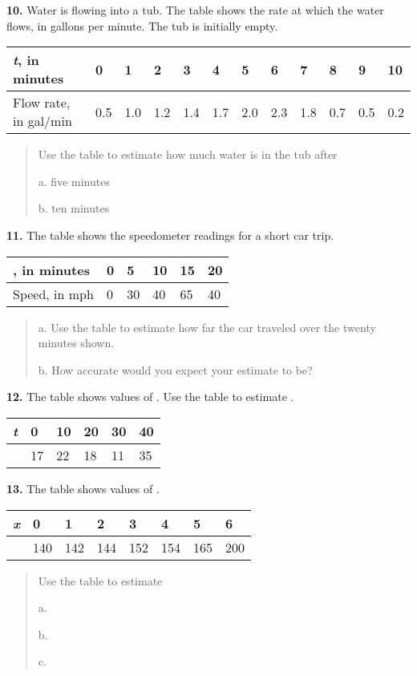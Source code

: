 \textbf{10.} Water is flowing into a tub. The table shows the rate at
which the water flows, in gallons per minute. The tub is initially
empty.

\begin{longtable}[]{@{}llllllllllll@{}}
\toprule
\emph{t}, in minutes & 0 & 1 & 2 & 3 & 4 & 5 & 6 & 7 & 8 & 9 &
10\tabularnewline
\midrule
\endhead
Flow rate, in gal/min & 0.5 & 1.0 & 1.2 & 1.4 & 1.7 & 2.0 & 2.3 & 1.8 &
0.7 & 0.5 & 0.2\tabularnewline
\bottomrule
\end{longtable}

\begin{quote}
Use the table to estimate how much water is in the tub after

a. five minutes

b. ten minutes
\end{quote}

\textbf{11.} The table shows the speedometer readings for a short car
trip.

\begin{longtable}[]{@{}llllll@{}}
\toprule
, in minutes & 0 & 5 & 10 & 15 & 20\tabularnewline
\midrule
\endhead
Speed, in mph & 0 & 30 & 40 & 65 & 40\tabularnewline
\bottomrule
\end{longtable}

\begin{quote}
a. Use the table to estimate how far the car traveled over the twenty
minutes shown.

b. How accurate would you expect your estimate to be?
\end{quote}

\textbf{12.} The table shows values of . Use the table to estimate .

\begin{longtable}[]{@{}llllll@{}}
\toprule
\emph{t} & 0 & 10 & 20 & 30 & 40\tabularnewline
\midrule
\endhead
& 17 & 22 & 18 & 11 & 35\tabularnewline
\bottomrule
\end{longtable}

\textbf{13.} The table shows values of .

\begin{longtable}[]{@{}llllllll@{}}
\toprule
\emph{x} & 0 & 1 & 2 & 3 & 4 & 5 & 6\tabularnewline
\midrule
\endhead
& 140 & 142 & 144 & 152 & 154 & 165 & 200\tabularnewline
\bottomrule
\end{longtable}

\begin{quote}
Use the table to estimate

a.

b.

c.
\end{quote}

